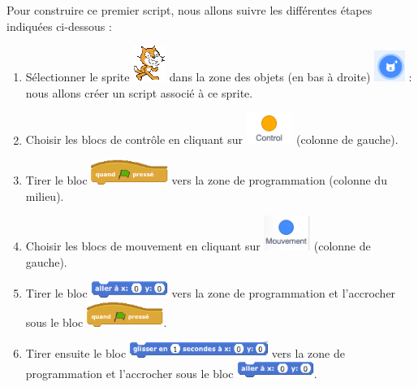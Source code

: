 Pour construire ce premier script, nous allons suivre les différentes étapes indiquées ci-dessous :


\begin{enumerate}
\item Sélectionner le sprite \includegraphics[width=.7cm]{./images/scratch/Lutin} dans la zone des objets (en bas à droite) \includegraphics[width=1cm]{./images/scratch/sprite.png} : nous allons créer un script associé à ce sprite.
\item Choisir les blocs de contrôle en cliquant sur \includegraphics[width=1.5cm]{./images/scratch/control.png} (colonne de gauche).
\item Tirer le bloc \includegraphics[width=2.5cm]{./images/scratch/BlocDrapeauVert} vers la zone de programmation (colonne du milieu).
\item Choisir les blocs de mouvement en cliquant sur \includegraphics[width=1.5cm]{./images/scratch/mouvement.png} (colonne de gauche).
\item Tirer le bloc \includegraphics[width=2.5cm]{./images/scratch/BlocAllerA} vers la zone de programmation et l'accrocher sous le bloc \includegraphics[width=2.5cm]{./images/scratch/BlocDrapeauVert}.
\item Tirer ensuite le bloc \includegraphics[width=4.5cm]{./images/scratch/BlocGlisser} vers la zone de programmation et l'accrocher sous le bloc \includegraphics[width=2.5cm]{./images/scratch/BlocAllerA}.

\end{enumerate}
